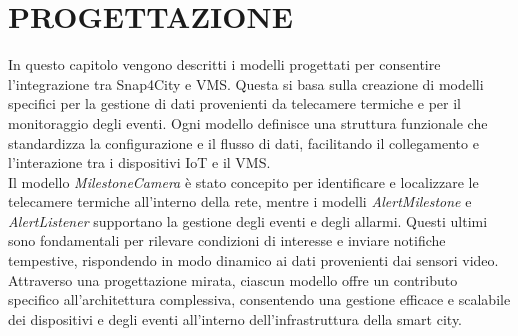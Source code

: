 \documentclass[a4paper, openright, thesis]{report}
\begin{document}
\chapter{PROGETTAZIONE}
In questo capitolo vengono descritti i modelli progettati per consentire l'integrazione tra Snap4City e VMS. Questa si basa sulla creazione di modelli specifici per la gestione di dati provenienti da telecamere termiche e per il monitoraggio degli eventi. Ogni modello definisce una struttura funzionale che standardizza la configurazione e il flusso di dati, facilitando il collegamento e l’interazione tra i dispositivi IoT e il VMS. \\ Il modello \textit{MilestoneCamera} è stato concepito per identificare e localizzare le telecamere termiche all'interno della rete, mentre i modelli \textit{AlertMilestone} e \textit{AlertListener} supportano la gestione degli eventi e degli allarmi. Questi ultimi sono fondamentali per rilevare condizioni di interesse e inviare notifiche tempestive, rispondendo in modo dinamico ai dati provenienti dai sensori video. \\ Attraverso una progettazione mirata, ciascun modello offre un contributo specifico all’architettura complessiva, consentendo una gestione efficace e scalabile dei dispositivi e degli eventi all'interno dell'infrastruttura della smart city.
\end{document}
